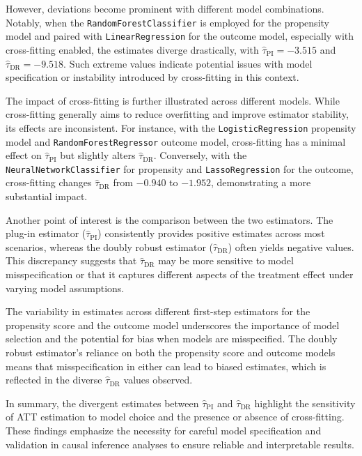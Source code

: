 \documentclass{article}
\begin{document}
However, deviations become prominent with different model combinations. Notably, when the \texttt{RandomForestClassifier} is employed for the propensity model and paired with \texttt{LinearRegression} for the outcome model, especially with cross-fitting enabled, the estimates diverge drastically, with $\hat{\tau}_{\text{PI}} = -3.515$ and $\hat{\tau}_{\text{DR}} = -9.518$. Such extreme values indicate potential issues with model specification or instability introduced by cross-fitting in this context.

The impact of cross-fitting is further illustrated across different models. While cross-fitting generally aims to reduce overfitting and improve estimator stability, its effects are inconsistent. For instance, with the \texttt{LogisticRegression} propensity model and \texttt{RandomForestRegressor} outcome model, cross-fitting has a minimal effect on $\hat{\tau}_{\text{PI}}$ but slightly alters $\hat{\tau}_{\text{DR}}$. Conversely, with the \texttt{NeuralNetworkClassifier} for propensity and \texttt{LassoRegression} for the outcome, cross-fitting changes $\hat{\tau}_{\text{DR}}$ from $-0.940$ to $-1.952$, demonstrating a more substantial impact.

Another point of interest is the comparison between the two estimators. The plug-in estimator ($\hat{\tau}_{\text{PI}}$) consistently provides positive estimates across most scenarios, whereas the doubly robust estimator ($\hat{\tau}_{\text{DR}}$) often yields negative values. This discrepancy suggests that $\hat{\tau}_{\text{DR}}$ may be more sensitive to model misspecification or that it captures different aspects of the treatment effect under varying model assumptions.

The variability in estimates across different first-step estimators for the propensity score and the outcome model underscores the importance of model selection and the potential for bias when models are misspecified. The doubly robust estimator's reliance on both the propensity score and outcome models means that misspecification in either can lead to biased estimates, which is reflected in the diverse $\hat{\tau}_{\text{DR}}$ values observed.

In summary, the divergent estimates between $\hat{\tau}_{\text{PI}}$ and $\hat{\tau}_{\text{DR}}$ highlight the sensitivity of ATT estimation to model choice and the presence or absence of cross-fitting. These findings emphasize the necessity for careful model specification and validation in causal inference analyses to ensure reliable and interpretable results.
\end{document}
